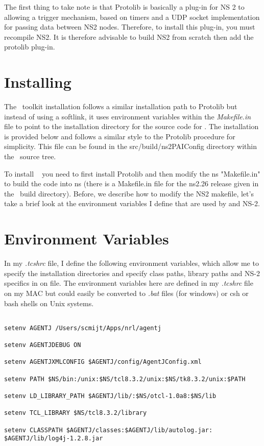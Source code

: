 The first thing to take note is that Protolib is basically a plug-in for NS
2 to allowing a trigger mechanism, based on timers and a UDP socket
implementation for passing data between NS2 nodes.  Therefore,
to install this plug-in, you must recompile NS2. It is therefore advisable
to build NS2 from scratch then add the protolib plug-in.


\section{Installing \agentj}
\label{install:agentj}

The \agentj~toolkit installation follows a similar installation path to 
Protolib but instead of using a softlink, it uses environment variables within 
the \emph{Makefile.in} file to point to the installation directory for the
source code for \agentj. The installation is provided below
and follows a similar style to the Protolib procedure for simplicity.
This file can be found in the src/build/ns2PAIConfig directory
within  the \agentj~source tree.

To install \agentj~ you need to first install 
Protolib and then modify the ns "Makefile.in" to build the \agentj
code into ns (there is a Makefile.in file for the ns2.26 
release given in the \agentj~build directory). Before, we
describe how to modify the NS2 makefile, let's take a brief look
at the environment variables I define that are used by \agentj and NS-2.

\section{Environment Variables}
\label{install:env}

In my \emph{.tcshrc} file, I define the following environment variables, which
allow me to specify the installation directories and specify class paths, library 
paths and NS-2 specifics in on file.  The environment variables here are 
defined in my \emph{.tcshrc} file on my MAC but could easily be converted 
to \emph{.bat} files (for windows) or csh or bash shells on Unix systems.

\footnotesize
\begin{verbatim}

setenv AGENTJ /Users/scmijt/Apps/nrl/agentj

setenv AGENTJDEBUG ON

setenv AGENTJXMLCONFIG $AGENTJ/config/AgentJConfig.xml

setenv PATH $NS/bin:/unix:$NS/tcl8.3.2/unix:$NS/tk8.3.2/unix:$PATH

setenv LD_LIBRARY_PATH $AGENTJ/lib/:$NS/otcl-1.0a8:$NS/lib

setenv TCL_LIBRARY $NS/tcl8.3.2/library
   
setenv CLASSPATH $AGENTJ/classes:$AGENTJ/lib/autolog.jar:
$AGENTJ/lib/log4j-1.2.8.jar

\end{verbatim}
\normalsize

